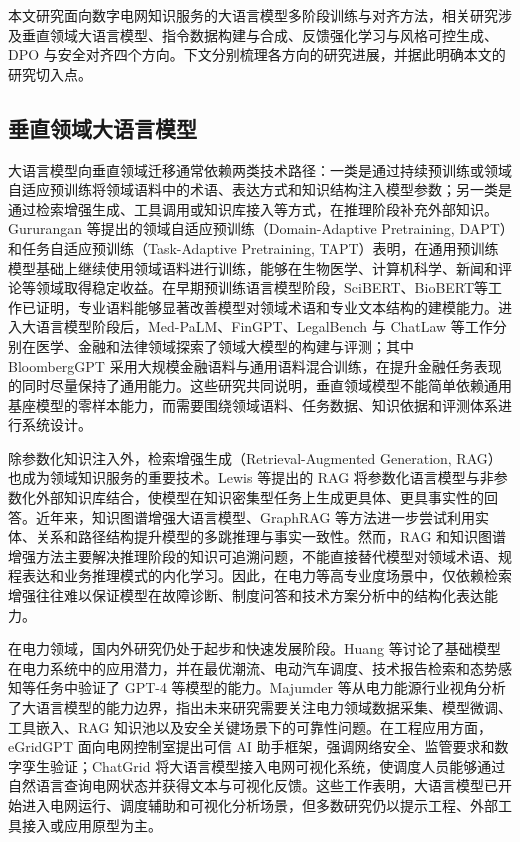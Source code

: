 \documentclass[fontset=fandol,type=master,campus=shenzhen,etitleauto=true]{hithesisbook}
\begin{document}
本文研究面向数字电网知识服务的大语言模型多阶段训练与对齐方法，相关研究涉及垂直领域大语言模型、指令数据构建与合成、反馈强化学习与风格可控生成、DPO 与安全对齐四个方向。下文分别梳理各方向的研究进展，并据此明确本文的研究切入点。

\subsection{垂直领域大语言模型}

大语言模型向垂直领域迁移通常依赖两类技术路径：一类是通过持续预训练或领域自适应预训练将领域语料中的术语、表达方式和知识结构注入模型参数；另一类是通过检索增强生成、工具调用或知识库接入等方式，在推理阶段补充外部知识。Gururangan 等提出的领域自适应预训练（Domain-Adaptive Pretraining, DAPT）和任务自适应预训练（Task-Adaptive Pretraining, TAPT）表明，在通用预训练模型基础上继续使用领域语料进行训练，能够在生物医学、计算机科学、新闻和评论等领域取得稳定收益\cite{ref6}。在早期预训练语言模型阶段，SciBERT\cite{ref7}、BioBERT\cite{ref8}等工作已证明，专业语料能够显著改善模型对领域术语和专业文本结构的建模能力。进入大语言模型阶段后，Med-PaLM\cite{ref9}、FinGPT\cite{ref11}、LegalBench 与 ChatLaw\cite{ref12,ref13} 等工作分别在医学、金融和法律领域探索了领域大模型的构建与评测；其中 BloombergGPT 采用大规模金融语料与通用语料混合训练，在提升金融任务表现的同时尽量保持了通用能力\cite{ref10}。这些研究共同说明，垂直领域模型不能简单依赖通用基座模型的零样本能力，而需要围绕领域语料、任务数据、知识依据和评测体系进行系统设计。

除参数化知识注入外，检索增强生成（Retrieval-Augmented Generation, RAG）也成为领域知识服务的重要技术。Lewis 等提出的 RAG 将参数化语言模型与非参数化外部知识库结合，使模型在知识密集型任务上生成更具体、更具事实性的回答\cite{ref14}。近年来，知识图谱增强大语言模型、GraphRAG 等方法进一步尝试利用实体、关系和路径结构提升模型的多跳推理与事实一致性\cite{ref15,ref16}。然而，RAG 和知识图谱增强方法主要解决推理阶段的知识可追溯问题，不能直接替代模型对领域术语、规程表达和业务推理模式的内化学习。因此，在电力等高专业度场景中，仅依赖检索增强往往难以保证模型在故障诊断、制度问答和技术方案分析中的结构化表达能力。

在电力领域，国内外研究仍处于起步和快速发展阶段。Huang 等讨论了基础模型在电力系统中的应用潜力，并在最优潮流、电动汽车调度、技术报告检索和态势感知等任务中验证了 GPT-4 等模型的能力\cite{ref17}。Majumder 等从电力能源行业视角分析了大语言模型的能力边界，指出未来研究需要关注电力领域数据采集、模型微调、工具嵌入、RAG 知识池以及安全关键场景下的可靠性问题\cite{ref4}。在工程应用方面，eGridGPT 面向电网控制室提出可信 AI 助手框架，强调网络安全、监管要求和数字孪生验证\cite{ref18}；ChatGrid 将大语言模型接入电网可视化系统，使调度人员能够通过自然语言查询电网状态并获得文本与可视化反馈\cite{ref19}。这些工作表明，大语言模型已开始进入电网运行、调度辅助和可视化分析场景，但多数研究仍以提示工程、外部工具接入或应用原型为主。
\end{document}

